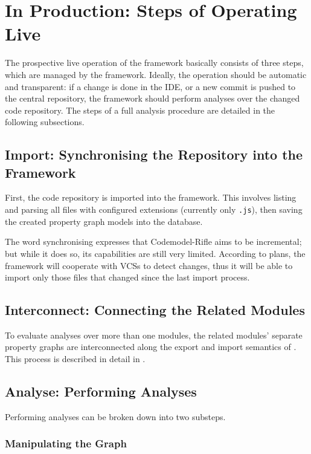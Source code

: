 \section{In Production: Steps of Operating Live}

The prospective live operation of the framework basically consists of three steps, which are managed by the framework. Ideally, the operation should be automatic and transparent: if a change is done in the IDE, or a new commit is pushed to the central repository, the framework should perform analyses over the changed code repository. The steps of a full analysis procedure are detailed in the following subsections.


\subsection{Import: Synchronising the Repository into the Framework}

First, the code repository is imported into the framework. This involves listing and parsing all files with configured extensions (currently only \lstinline{.js}), then saving the created property graph models into the database.

The word synchronising expresses that Codemodel-Rifle aims to be incremental; but while it does so, its capabilities are still very limited. According to plans, the framework will cooperate with VCSs to detect changes, thus it will be able to import only those files that changed since the last import process.


\subsection{Interconnect: Connecting the Related \es Modules}

To evaluate analyses over more than one \es modules, the related modules' separate property graphs are interconnected along the export and import semantics of \es. This process is described in detail in .


\subsection{Analyse: Performing Analyses}

Performing analyses can be broken down into two substeps.


\subsubsection{Manipulating the Graph}

